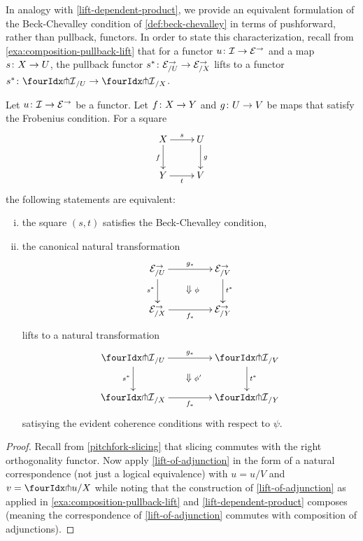 \documentclass[reqno,10pt,a4paper,oneside,draft]{amsart}
\begin{document}
In analogy with \cref{lift-dependent-product}, we provide an equivalent formulation of the Beck-Chevalley condition of \cref{def:beck-chevalley} in terms of pushforward, rather than pullback, functors.
In order to state this characterization, recall from \cref{exa:composition-pullback-lift} that for a functor $u \colon \mathcal{I} \to \mathcal{E}^\to$ and a map $s \colon X \to U$, the pullback functor $s^* \colon \mathcal{E}^\to_{/U} \to \mathcal{E}^\to_{/X}$ lifts to a functor $s^* \co {\liftr{\cal{I}}}_{/U} \to {\liftr{\cal{I}}}_{/X}$.

\begin{proposition} \label{lift-pushforward-BC}
Let $u \colon \mathcal{I} \to \mathcal{E}^\to$ be a functor.
Let $f \colon X \to Y$ and $g \colon U \to V$ be maps that satisfy the Frobenius condition.
For a square
\[
\xymatrix{
  X
  \ar[d]_{f}
  \ar[r]^{s}
&
  U
  \ar[d]^{g}
\\
  Y
  \ar[r]_{t}
&
  V
}
\]
the following statements are equivalent:
\begin{enumerate}[(i)]
\item the square $(s,t)$ satisfies the Beck-Chevalley condition,
\item the canonical natural transformation
\[
\xymatrix@C+2em{
  \catE^\to_{/U}
  \ar[r]^{g_*}
   \ar[d]_{s^*}
  \ar@{}[dr]|{\textstyle\Downarrow \rlap{$\labelstyle\phi$}}
&
\catE^\to_{/V}
 \ar[d]^{t^*}
\\
  \catE^\to_{/X}
  \ar[r]_{f_*}
&
  \catE^\to_{/Y}
}
\]
lifts to a natural transformation
\[
\xymatrix@C+2em{
  {\liftr{\cal{I}}}_{/U}
  \ar[r]^{g_*}
  \ar[d]_{s^*}
  \ar@{}[dr]|{\textstyle\Downarrow \rlap{$\labelstyle\phi'$}}
&
  {\liftr{\cal{I}}}_{/V}
  \ar[d]^{t^*}
\\
  {\liftr{\cal{I}}}_{/X}
  \ar[r]_{f_*}
&
  {\liftr{\cal{I}}}_{/Y}
}
\]
satisying the evident coherence conditions with respect to $\psi$.
\end{enumerate}
\end{proposition}

\begin{proof}
Recall from \cref{pitchfork-slicing} that slicing commutes with the right orthogonality functor.
Now apply \cref{lift-of-adjunction} in the form of a natural correspondence (not just a logical equivalence) with $u = u/V$ and $v = \liftr{u}/X$ while noting that the construction of \cref{lift-of-adjunction} as applied in \cref{exa:composition-pullback-lift} and \cref{lift-dependent-product} composes (meaning the correspondence of \cref{lift-of-adjunction} commutes with composition of adjunctions).
\end{proof}
\end{document}
